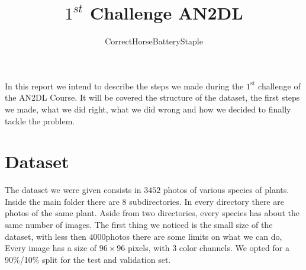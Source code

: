 \documentclass[a4paper,12pt]{article}
\numberwithin{equation}{section}
\begin{document}
\title{\vspace{-3cm}\(1^{st}\) Challenge AN2DL}
\author{CorrectHorseBatteryStaple}
\date{}
\maketitle
In this report we intend to describe the steps we made during the \(1^{\text{st}}\) challenge of the AN2DL Course. It will be covered the structure of the dataset, the first steps we made, what we did right, what we did wrong and how we decided to finally tackle the problem.
\section*{Dataset}
The dataset we were given consists in \(3452\) photos of various species of plants. Inside the main folder there are \(8\) subdirectories. In every directory there are photos of the same plant. Aside from two directories, every species has about the same number of images. The first thing we noticed is the small size of the dataset, with less then \(4000\)photos there are some limits on what we can do, Every image has a size of \(96 \times 96\) pixels, with \(3\) color channels. We opted for a 90\%/10\% split for the test and validation set.
\end{document}
